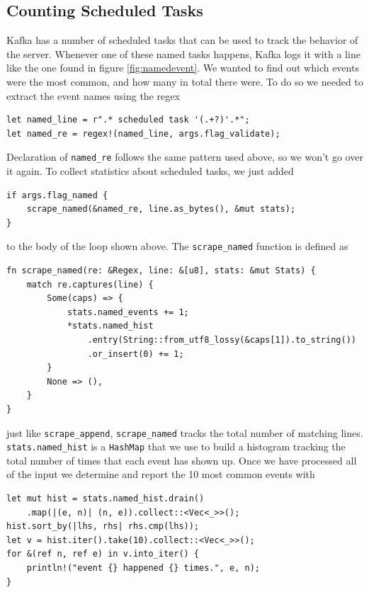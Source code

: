 \subsection{Counting Scheduled Tasks}

Kafka has a number of scheduled tasks that can be used to track
the behavior of the server. Whenever one of these named
tasks happens, Kafka logs it with a line like the one
found in figure \ref{fig:namedevent}. We wanted to find out which
events were the most common, and how many in total there were.
To do so we needed to extract the event names using the
regex

\begin{verbatim}
let named_line = r".* scheduled task '(.+?)'.*";
let named_re = regex!(named_line, args.flag_validate);
\end{verbatim}

\noindent
Declaration of \verb'named_re' follows the same pattern used above,
so we won't go over it again. To collect statistics about scheduled
tasks, we just added

\begin{verbatim}
if args.flag_named {
    scrape_named(&named_re, line.as_bytes(), &mut stats);
}
\end{verbatim}

\noindent
to the body of the loop shown above. The \verb'scrape_named'
function is defined as

\begin{verbatim}
fn scrape_named(re: &Regex, line: &[u8], stats: &mut Stats) {
    match re.captures(line) {
        Some(caps) => {
            stats.named_events += 1;
            *stats.named_hist
                .entry(String::from_utf8_lossy(&caps[1]).to_string())
                .or_insert(0) += 1;
        }
        None => (),
    }
}
\end{verbatim}

\noindent
just like \verb'scrape_append', \verb'scrape_named'
tracks the total number of matching lines. \verb'stats.named_hist'
is a \verb'HashMap' that we use to build a histogram tracking the
total number of times that each event has shown up. Once we have
processed all of the input we determine and report the 10 most common
events with

\begin{verbatim}
let mut hist = stats.named_hist.drain()
    .map(|(e, n)| (n, e)).collect::<Vec<_>>();
hist.sort_by(|lhs, rhs| rhs.cmp(lhs));
let v = hist.iter().take(10).collect::<Vec<_>>();
for &(ref n, ref e) in v.into_iter() {
    println!("event {} happened {} times.", e, n);
}
\end{verbatim}

